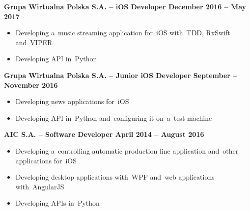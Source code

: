 \documentclass[11pt,a4paper]{article}
\newcommand*\header[1]{
    \noindent\raisebox{.1cm}{\color{MidnightBlue}\rule{1.5cm}{.1cm}\hspace{.2cm}\raisebox{-.1cm}{\large\bf #1}}}
\begin{document}
    {\bf Grupa Wirtualna Polska S.A. -- iOS Developer \hfill December 2016 -- May 2017}

    \vspace{-.23cm}
    \begin{itemize}[leftmargin=1.5cm] \itemsep.2mm \parskip0mm 
        \item Developing a~music streaming application for~iOS with~TDD, RxSwift and~VIPER
        \item Developing API in~Python
    \end{itemize}

    \vspace{-.17cm}

    {\bf Grupa Wirtualna Polska S.A. -- Junior iOS Developer \hfill September -- November 2016}

    \vspace{-.23cm}
    \begin{itemize}[leftmargin=1.5cm] \itemsep.2mm \parskip0mm 
        \item Developing news applications for~iOS
        \item Developing API in~Python and~configuring it on~a~test machine
    \end{itemize}

    \vspace{-.17cm}

    {\bf AIC S.A. -- Software Developer \hfill April 2014 -- August 2016}

    \vspace{-.23cm}
    \begin{itemize}[leftmargin=1.5cm] \itemsep.2mm \parskip0mm 
        \item Developing a~controlling automatic production line application and~other applications for~iOS
        \item Developing desktop applications with~WPF and~web applications with~AngularJS
        \item Developing APIs in~Python
    \end{itemize}


    \medskip
  
    \header{Education}
  
    \smallskip
\end{document}
